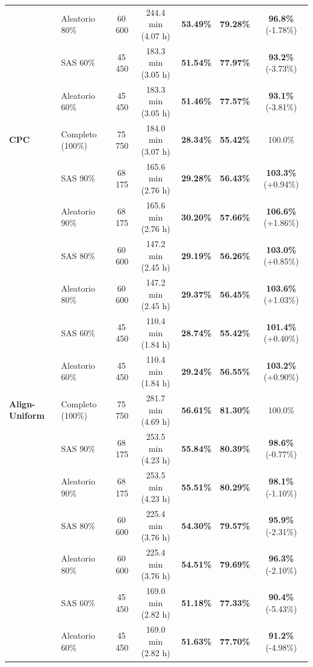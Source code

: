\begin{table}[t]
\begin{tabular}{llccccc}
                  & Aleatorio 80\%    & 60\,600 & 244.4 min (4.07 h)     & \textbf{53.49\%} & \textbf{79.28\%} & \textbf{96.8\%} (-1.78\%) \\
                  & SAS 60\%          & 45\,450 & 183.3 min (3.05 h)     & \textbf{51.54\%} & \textbf{77.97\%} & \textbf{93.2\%} (-3.73\%) \\
                  & Aleatorio 60\%    & 45\,450 & 183.3 min (3.05 h)     & \textbf{51.46\%} & \textbf{77.57\%} & \textbf{93.1\%} (-3.81\%) \\
\midrule
\textbf{CPC}      & Completo (100\%)  & 75\,750 & 184.0 min (3.07 h)     & \textbf{28.34\%} & \textbf{55.42\%} & 100.0\% \\
                  & SAS 90\%          & 68\,175 & 165.6 min (2.76 h)     & \textbf{29.28\%} & \textbf{56.43\%} & \textbf{103.3\%} (+0.94\%) \\
                  & Aleatorio 90\%    & 68\,175 & 165.6 min (2.76 h)     & \textbf{30.20\%} & \textbf{57.66\%} & \textbf{106.6\%} (+1.86\%) \\
                  & SAS 80\%          & 60\,600 & 147.2 min (2.45 h)     & \textbf{29.19\%} & \textbf{56.26\%} & \textbf{103.0\%} (+0.85\%) \\
                  & Aleatorio 80\%    & 60\,600 & 147.2 min (2.45 h)     & \textbf{29.37\%} & \textbf{56.45\%} & \textbf{103.6\%} (+1.03\%) \\
                  & SAS 60\%          & 45\,450 & 110.4 min (1.84 h)     & \textbf{28.74\%} & \textbf{55.42\%} & \textbf{101.4\%} (+0.40\%) \\
                  & Aleatorio 60\%    & 45\,450 & 110.4 min (1.84 h)     & \textbf{29.24\%} & \textbf{56.55\%} & \textbf{103.2\%} (+0.90\%) \\
\midrule
\textbf{Align-Uniform} & Completo (100\%)  & 75\,750 & 281.7 min (4.69 h)     & \textbf{56.61\%} & \textbf{81.30\%} & 100.0\% \\
                  & SAS 90\%          & 68\,175 & 253.5 min (4.23 h)     & \textbf{55.84\%} & \textbf{80.39\%} & \textbf{98.6\%} (-0.77\%) \\
                  & Aleatorio 90\%    & 68\,175 & 253.5 min (4.23 h)     & \textbf{55.51\%} & \textbf{80.29\%} & \textbf{98.1\%} (-1.10\%) \\
                  & SAS 80\%          & 60\,600 & 225.4 min (3.76 h)     & \textbf{54.30\%} & \textbf{79.57\%} & \textbf{95.9\%} (-2.31\%) \\
                  & Aleatorio 80\%    & 60\,600 & 225.4 min (3.76 h)     & \textbf{54.51\%} & \textbf{79.69\%} & \textbf{96.3\%} (-2.10\%) \\
                  & SAS 60\%          & 45\,450 & 169.0 min (2.82 h)     & \textbf{51.18\%} & \textbf{77.33\%} & \textbf{90.4\%} (-5.43\%) \\
                  & Aleatorio 60\%    & 45\,450 & 169.0 min (2.82 h)     & \textbf{51.63\%} & \textbf{77.70\%} & \textbf{91.2\%} (-4.98\%) \\
\bottomrule
\end{tabular}
\end{table}


